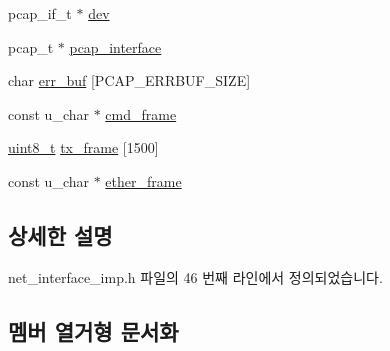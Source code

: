 \begin{DoxyCompactItemize}
\item 
pcap\+\_\+if\+\_\+t $\ast$ \hyperlink{classavdecc__lib_1_1net__interface__imp_a9d50f4041da5aab1803bd7ba0890271b}{dev}
\item 
pcap\+\_\+t $\ast$ \hyperlink{classavdecc__lib_1_1net__interface__imp_af13d606f9af9d6d27ac8ddd57d76c301}{pcap\+\_\+interface}
\item 
char \hyperlink{classavdecc__lib_1_1net__interface__imp_af8607f378f68a61a48fb0744883f3e77}{err\+\_\+buf} \mbox{[}P\+C\+A\+P\+\_\+\+E\+R\+R\+B\+U\+F\+\_\+\+S\+I\+ZE\mbox{]}
\item 
const u\+\_\+char $\ast$ \hyperlink{classavdecc__lib_1_1net__interface__imp_aaaccbf362f7c8788f3dcb4d576e4d38d}{cmd\+\_\+frame}
\item 
\hyperlink{stdint_8h_aba7bc1797add20fe3efdf37ced1182c5}{uint8\+\_\+t} \hyperlink{classavdecc__lib_1_1net__interface__imp_a3073db465b138ac609f7c659b9d12c57}{tx\+\_\+frame} \mbox{[}1500\mbox{]}
\item 
const u\+\_\+char $\ast$ \hyperlink{classavdecc__lib_1_1net__interface__imp_a446d7049f03f1ab66502601e8cbf7180}{ether\+\_\+frame}
\end{DoxyCompactItemize}


\subsection{상세한 설명}


net\+\_\+interface\+\_\+imp.\+h 파일의 46 번째 라인에서 정의되었습니다.



\subsection{멤버 열거형 문서화}
